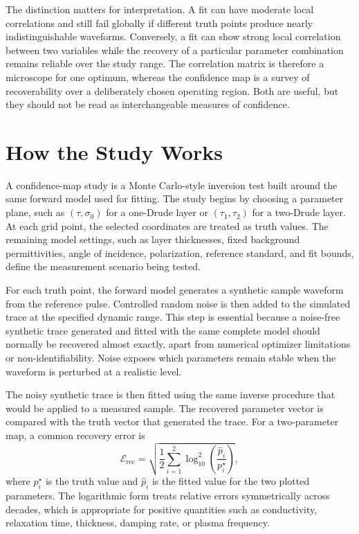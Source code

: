 \documentclass[11pt]{article}
\newcommand{\Erec}{\mathcal{E}_{\mathrm{rec}}}
\begin{document}
The distinction matters for interpretation. A fit can have moderate local correlations and still fail globally if different truth points produce nearly indistinguishable waveforms. Conversely, a fit can show strong local correlation between two variables while the recovery of a particular parameter combination remains reliable over the study range. The correlation matrix is therefore a microscope for one optimum, whereas the confidence map is a survey of recoverability over a deliberately chosen operating region. Both are useful, but they should not be read as interchangeable measures of confidence.

\section{How the Study Works}

A confidence-map study is a Monte Carlo-style inversion test built around the same forward model used for fitting. The study begins by choosing a parameter plane, such as \((\tau,\sigma_0)\) for a one-Drude layer or \((\tau_1,\tau_2)\) for a two-Drude layer. At each grid point, the selected coordinates are treated as truth values. The remaining model settings, such as layer thicknesses, fixed background permittivities, angle of incidence, polarization, reference standard, and fit bounds, define the measurement scenario being tested.

For each truth point, the forward model generates a synthetic sample waveform from the reference pulse. Controlled random noise is then added to the simulated trace at the specified dynamic range. This step is essential because a noise-free synthetic trace generated and fitted with the same complete model should normally be recovered almost exactly, apart from numerical optimizer limitations or non-identifiability. Noise exposes which parameters remain stable when the waveform is perturbed at a realistic level.

The noisy synthetic trace is then fitted using the same inverse procedure that would be applied to a measured sample. The recovered parameter vector is compared with the truth vector that generated the trace. For a two-parameter map, a common recovery error is
\begin{equation}
  \Erec
  =
  \sqrt{
    \frac{1}{2}
    \sum_{i=1}^{2}
    \log_{10}^{2}
    \left(
      \frac{\hat{p}_i}{p_i^\star}
    \right)
  },
  \label{eq:recovery_error}
\end{equation}
where \(p_i^\star\) is the truth value and \(\hat{p}_i\) is the fitted value for the two plotted parameters. The logarithmic form treats relative errors symmetrically across decades, which is appropriate for positive quantities such as conductivity, relaxation time, thickness, damping rate, or plasma frequency.
\end{document}
